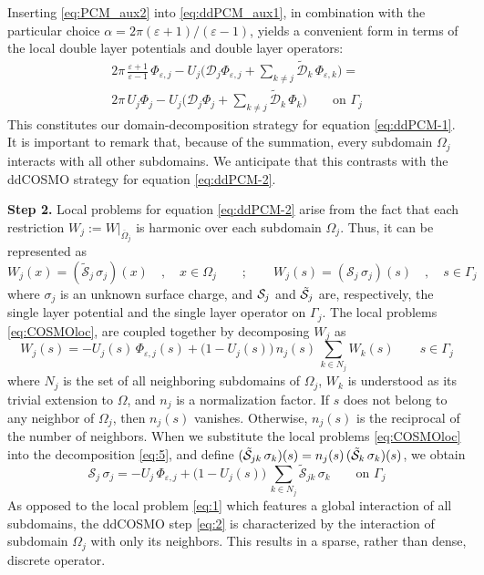 Inserting \eqref{eq:PCM_aux2} into \eqref{eq:ddPCM_aux1}, in combination with the particular choice $\alpha = 2\pi(\varepsilon + 1)/(\varepsilon - 1)$, yields a convenient form in terms of the local double layer potentials and double layer operators:
\begin{multline}\label{eq:1}
2\pi \, \frac{\varepsilon + 1}{\varepsilon - 1} \, \Phi_{\varepsilon,j} - U_j \bigg( {\mathcal{D}}_j \Phi_{\varepsilon,j} + \sum_{k \ne j} \tilde{\mathcal{D}}_{k} \, \Phi_{\varepsilon,k}  \bigg) = \\ 2 \pi \, U_j \Phi_j - U_j \bigg( {\mathcal{D}}_j \Phi_{j} + \sum_{k \ne j} \tilde{\mathcal{D}}_{k} \, \Phi_{k}  \bigg) \qquad \text{on }\Gamma_j
\end{multline}
This constitutes our domain-decomposition strategy for equation \eqref{eq:ddPCM-1}. It is important to remark that, because of the summation, every subdomain $\Omega_j$ interacts with all other subdomains. We anticipate that this contrasts with the ddCOSMO strategy for equation \eqref{eq:ddPCM-2}.

{\bf Step 2.} Local problems for equation \eqref{eq:ddPCM-2} arise from the fact that each restriction $W_j := W |_{\overline{\Omega}_j}$ is harmonic over each subdomain $\Omega_j$. Thus, it can be represented as 
\begin{equation}\label{eq:COSMOloc}
W_j(x) = (\tilde{\mathcal{S}}_j \,  \sigma_j) (x) \quad , \quad x \in \Omega_j \qquad ; \qquad
W_j(s) = (\mathcal{S}_j \,  \sigma_j) (s) \quad , \quad s \in \Gamma_j
\end{equation}
where $\sigma_j$ is an unknown surface charge, and $\mathcal{S}_j$ and $\tilde{\mathcal{S}}_j$ are, respectively, the single layer potential and the single layer operator on $\Gamma_j$. The local problems \eqref{eq:COSMOloc}, are coupled together by decomposing $W_j$ as
\begin{equation}\label{eq:5}
W_j(s) = - U_j(s) \, \Phi_{\varepsilon,j}(s) +  \big (1 - U_j(s)\big ) \, n_j(s) \, \sum_{k \in N_j} {W}_k(s) \qquad s \in \Gamma_j
\end{equation}
where $N_j$ is the set of all neighboring subdomains of $\Omega_j$, $W_k$ is understood as its trivial extension to $\Omega$, and $n_j$ is a normalization factor. If $s$ does not belong to any neighbor of $\Omega_j$, then $n_j(s)$ vanishes. Otherwise, $n_j(s)$ is the reciprocal of the number of neighbors. When we substitute the local problems \eqref{eq:COSMOloc} into the decomposition \eqref{eq:5}, and define $(\tilde{\mathcal{S}}_{jk} \, \sigma_k) (s) = n_j(s) \, (\tilde{\mathcal{S}}_k \, \sigma_k)(s)$, we obtain
\begin{equation}\label{eq:2}
\mathcal{S}_j \, \sigma_j  = -U_j \, \Phi_{\varepsilon,j} + \big (1 - U_j(s)\big ) \, \sum_{k \in N_j} \tilde{\mathcal{S}}_{jk} \, \sigma_k \qquad \text{on } \Gamma_j
\end{equation}
As opposed to the local problem \eqref{eq:1} which features a global interaction of all subdomains, the ddCOSMO step \eqref{eq:2} is characterized by the interaction of subdomain $\Omega_j$ with only its neighbors. This results in a sparse, rather than dense, discrete operator.

